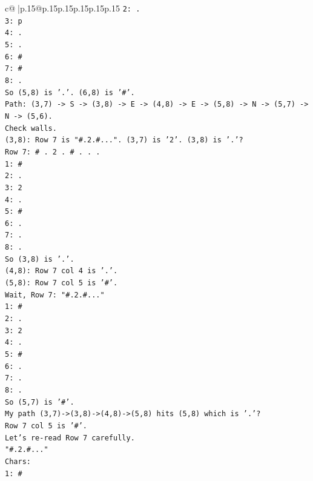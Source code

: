 \documentclass{article}
\begin{document}
{\begin{supertabular}{c@{$\;$}|p{.15\linewidth}@{}p{.15\linewidth}p{.15\linewidth}p{.15\linewidth}p{.15\linewidth}p{.15\linewidth}}
{{{\texttt{2: .} \\
\texttt{3: p} \\
\texttt{4: .} \\
\texttt{5: .} \\
\texttt{6: \#} \\
\texttt{7: \#} \\
\texttt{8: .} \\
\texttt{So (5,8) is '.'. (6,8) is '\#'.} \\
\texttt{Path: (3,7) {-}> S {-}> (3,8) {-}> E {-}> (4,8) {-}> E {-}> (5,8) {-}> N {-}> (5,7) {-}> N {-}> (5,6).} \\
\texttt{Check walls.} \\
\texttt{(3,8): Row 7 is "\#.2.\#...". (3,7) is '2'. (3,8) is '.'?} \\
\texttt{Row 7: \# . 2 . \# . . .} \\
\texttt{1: \#} \\
\texttt{2: .} \\
\texttt{3: 2} \\
\texttt{4: .} \\
\texttt{5: \#} \\
\texttt{6: .} \\
\texttt{7: .} \\
\texttt{8: .} \\
\texttt{So (3,8) is '.'.} \\
\texttt{(4,8): Row 7 col 4 is '.'.} \\
\texttt{(5,8): Row 7 col 5 is '\#'.} \\
\texttt{Wait, Row 7: "\#.2.\#..."} \\
\texttt{1: \#} \\
\texttt{2: .} \\
\texttt{3: 2} \\
\texttt{4: .} \\
\texttt{5: \#} \\
\texttt{6: .} \\
\texttt{7: .} \\
\texttt{8: .} \\
\texttt{So (5,7) is '\#'.} \\
\texttt{My path (3,7){-}>(3,8){-}>(4,8){-}>(5,8) hits (5,8) which is '.'?} \\
\texttt{Row 7 col 5 is '\#'.} \\
\texttt{Let's re{-}read Row 7 carefully.} \\
\texttt{"\#.2.\#..."} \\
\texttt{Chars:} \\
\texttt{1: \#} \\
}}}
\end{supertabular}}
\end{document}
